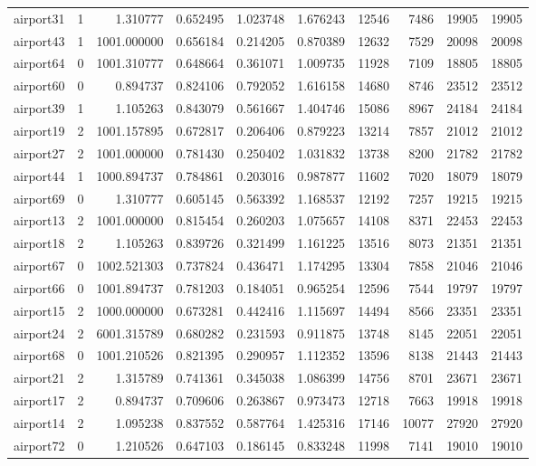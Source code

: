 \begin{longtable}{|l|r|r|r|r|r|r|r|r|r|}
airport31 & 1 & 1.310777 & 0.652495 & 1.023748 & 1.676243 & 12546 & 7486 & 19905 & 19905 \\
airport43 & 1 & 1001.000000 & 0.656184 & 0.214205 & 0.870389 & 12632 & 7529 & 20098 & 20098 \\
airport64 & 0 & 1001.310777 & 0.648664 & 0.361071 & 1.009735 & 11928 & 7109 & 18805 & 18805 \\
airport60 & 0 & 0.894737 & 0.824106 & 0.792052 & 1.616158 & 14680 & 8746 & 23512 & 23512 \\
airport39 & 1 & 1.105263 & 0.843079 & 0.561667 & 1.404746 & 15086 & 8967 & 24184 & 24184 \\
airport19 & 2 & 1001.157895 & 0.672817 & 0.206406 & 0.879223 & 13214 & 7857 & 21012 & 21012 \\
airport27 & 2 & 1001.000000 & 0.781430 & 0.250402 & 1.031832 & 13738 & 8200 & 21782 & 21782 \\
airport44 & 1 & 1000.894737 & 0.784861 & 0.203016 & 0.987877 & 11602 & 7020 & 18079 & 18079 \\
airport69 & 0 & 1.310777 & 0.605145 & 0.563392 & 1.168537 & 12192 & 7257 & 19215 & 19215 \\
airport13 & 2 & 1001.000000 & 0.815454 & 0.260203 & 1.075657 & 14108 & 8371 & 22453 & 22453 \\
airport18 & 2 & 1.105263 & 0.839726 & 0.321499 & 1.161225 & 13516 & 8073 & 21351 & 21351 \\
airport67 & 0 & 1002.521303 & 0.737824 & 0.436471 & 1.174295 & 13304 & 7858 & 21046 & 21046 \\
airport66 & 0 & 1001.894737 & 0.781203 & 0.184051 & 0.965254 & 12596 & 7544 & 19797 & 19797 \\
airport15 & 2 & 1000.000000 & 0.673281 & 0.442416 & 1.115697 & 14494 & 8566 & 23351 & 23351 \\
airport24 & 2 & 6001.315789 & 0.680282 & 0.231593 & 0.911875 & 13748 & 8145 & 22051 & 22051 \\
airport68 & 0 & 1001.210526 & 0.821395 & 0.290957 & 1.112352 & 13596 & 8138 & 21443 & 21443 \\
airport21 & 2 & 1.315789 & 0.741361 & 0.345038 & 1.086399 & 14756 & 8701 & 23671 & 23671 \\
airport17 & 2 & 0.894737 & 0.709606 & 0.263867 & 0.973473 & 12718 & 7663 & 19918 & 19918 \\
airport14 & 2 & 1.095238 & 0.837552 & 0.587764 & 1.425316 & 17146 & 10077 & 27920 & 27920 \\
airport72 & 0 & 1.210526 & 0.647103 & 0.186145 & 0.833248 & 11998 & 7141 & 19010 & 19010 \\

\end{longtable}
